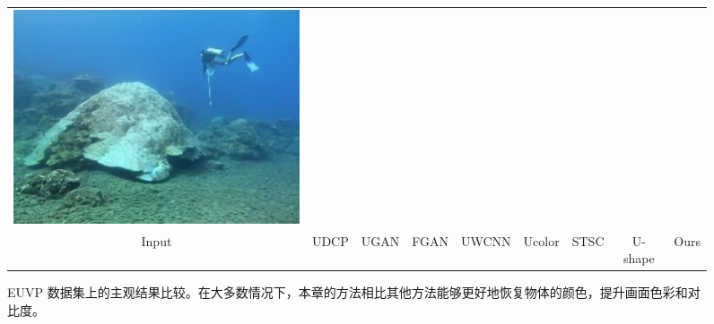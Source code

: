 \begin{figure}[t]
\begin{center}
\begin{tabular}{ccccccccc}
			\includegraphics[width = 0.10\linewidth,height=0.10\linewidth]{figures/ch3/compare/EUVP/Ours/im_f149_.png}   
            \\
			\scriptsize Input
			&\hspace{-0.50cm} \scriptsize UDCP\cite{udcp}
			&\hspace{-0.50cm} \scriptsize UGAN\cite{ugan}
			&\hspace{-0.50cm} \scriptsize FGAN\cite{funie_gan}
			&\hspace{-0.50cm} \scriptsize UWCNN\cite{uwcnn}
			&\hspace{-0.50cm} \scriptsize Ucolor\cite{ucolor}
			&\hspace{-0.50cm} \scriptsize STSC\cite{stsc}
			&\hspace{-0.50cm} \scriptsize U-shape\cite{u-shape}
			&\hspace{-0.50cm} \scriptsize Ours
			\\

		\end{tabular}
	\end{center}
	\vspace{-0.4mm}
	\caption{\label{img:visual-euvp}EUVP 数据集上的主观结果比较。在大多数情况下，本章的方法相比其他方法能够更好地恢复物体的颜色，提升画面色彩和对比度。}
	\vspace{-0.3mm}
\end{figure} 

